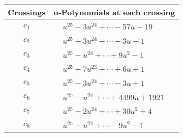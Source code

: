 \documentclass[1p]{elsarticle_modified}
\theoremstyle{definition}
\begin{document}
\begin{tabular}{m{50pt}|m{274pt}}
Crossings & \hspace{64pt}u-Polynomials at each crossing \\
\hline $$\begin{aligned}c_{1}\end{aligned}$$&$\begin{aligned}
&u^{25}-3 u^{24}+\cdots-57 u-19
\end{aligned}$\\
\hline $$\begin{aligned}c_{2}\end{aligned}$$&$\begin{aligned}
&u^{25}+3 u^{24}+\cdots-3 u-1
\end{aligned}$\\
\hline $$\begin{aligned}c_{3}\end{aligned}$$&$\begin{aligned}
&u^{25}- u^{24}+\cdots+9 u^2-1
\end{aligned}$\\
\hline $$\begin{aligned}c_{4}\end{aligned}$$&$\begin{aligned}
&u^{25}+7 u^{23}+\cdots+6 u+1
\end{aligned}$\\
\hline $$\begin{aligned}c_{5}\end{aligned}$$&$\begin{aligned}
&u^{25}-3 u^{24}+\cdots-3 u+1
\end{aligned}$\\
\hline $$\begin{aligned}c_{6}\end{aligned}$$&$\begin{aligned}
&u^{25}- u^{24}+\cdots+4499 u+1921
\end{aligned}$\\
\hline $$\begin{aligned}c_{7}\end{aligned}$$&$\begin{aligned}
&u^{25}+2 u^{24}+\cdots+30 u^2+4
\end{aligned}$\\
\hline $$\begin{aligned}c_{8}\end{aligned}$$&$\begin{aligned}
&u^{25}+u^{24}+\cdots-9 u^2+1
\end{aligned}$\\

\end{tabular}
\end{document}
